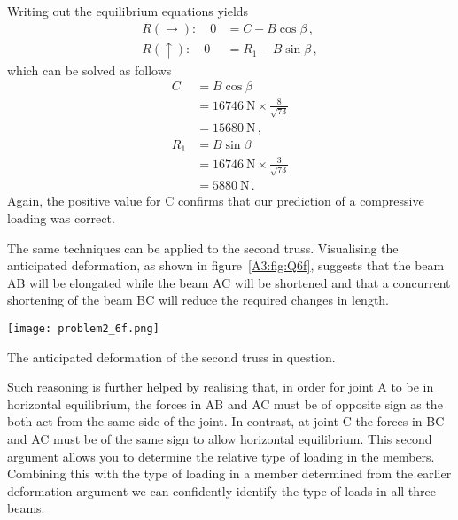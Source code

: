\documentclass[a4paper,justified,oneside]{tufte-handout}
\numberwithin{equation}{subsection}
\begin{document}
\begin{solution}
Writing out the equilibrium equations yields
\begin{align*}
	R(\rightarrow):\quad	0&=	C	-B\cos\beta	\,,	\\
	R(\uparrow):\quad		0&=	R_1	-B\sin\beta	\,,	
\end{align*}
which can be solved as follows
\begin{align*}
	C	&=	B\cos\beta	\\
		&=	\SI{16746}{\N} \times \frac{8}{\sqrt{73}}	\\
		&=	\SI{15680}{\N}	\,,	\\
	R_1	&=	B\sin\beta	\\
		&=	\SI{16746}{\N}	\times\frac{3}{\sqrt{73}}	\\
		&=	\SI{5880}{\N}	\,.
\end{align*}
Again, the positive value for C confirms that our prediction of a compressive loading was correct.

The same techniques can be applied to the second truss. Visualising the anticipated deformation, as shown in figure~\ref{A3:fig:Q6f}, suggests that the beam AB will be elongated while the beam AC will be shortened and that a concurrent shortening of the beam BC will reduce the required changes in length.
\begin{marginfigure}[-10mm]
	\centering
	\texttt{[image: problem2\_6f.png]}
	\caption{The anticipated deformation of the second truss in question.}
	\label{A3:fig:Q6f}
\end{marginfigure}
Such reasoning is further helped by realising that, in order for joint A to be in horizontal equilibrium, the forces in AB and AC must be of opposite sign as the both act from the same side of the joint. In contrast, at joint C the forces in BC and AC must be of the same sign to allow horizontal equilibrium. This second argument allows you to determine the relative type of loading in the members. Combining this with the type of loading in a member determined from the earlier deformation argument we can confidently identify the type of loads in all three beams.


\end{solution}
\end{document}
